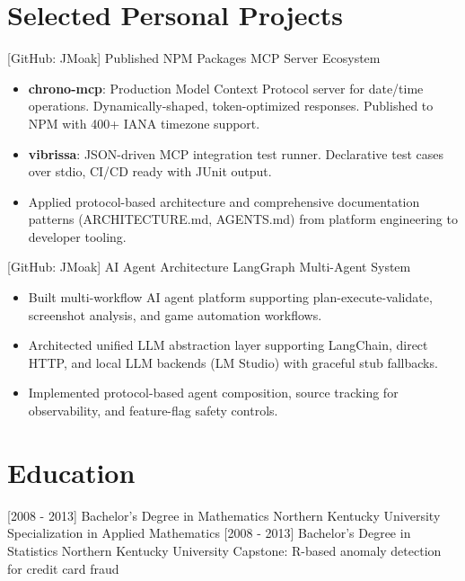 \documentclass[]{moak-resume}
\begin{document}
\section{Selected Personal Projects}
\begin{entrylist}
  \entry
    {[GitHub: JMoak]}
    {Published NPM Packages}
    {MCP Server Ecosystem}
    {}
\end{entrylist}
\begin{itemize}
  \item \small\bodyfont \textbf{chrono-mcp}: Production Model Context Protocol server for date/time operations. Dynamically-shaped, token-optimized responses. Published to NPM with 400+ IANA timezone support.
  \item \small\bodyfont \textbf{vibrissa}: JSON-driven MCP integration test runner. Declarative test cases over stdio, CI/CD ready with JUnit output.
  \item \small\bodyfont Applied protocol-based architecture and comprehensive documentation patterns (ARCHITECTURE.md, AGENTS.md) from platform engineering to developer tooling.
\end{itemize}

\begin{entrylist}
  \entry
    {[GitHub: JMoak]}
    {AI Agent Architecture}
    {LangGraph Multi-Agent System}
    {}
\end{entrylist}
\begin{itemize}
  \item \small\bodyfont Built multi-workflow AI agent platform supporting plan-execute-validate, screenshot analysis, and game automation workflows.
  \item \small\bodyfont Architected unified LLM abstraction layer supporting LangChain, direct HTTP, and local LLM backends (LM Studio) with graceful stub fallbacks.
  \item \small\bodyfont Implemented protocol-based agent composition, source tracking for observability, and feature-flag safety controls.
\end{itemize}

\section{Education}
\begin{entrylist}
  \entry
    {[2008 - 2013]}
    {Bachelor's Degree in Mathematics}
    {Northern Kentucky University}
    {Specialization in Applied Mathematics}
  \entry
    {[2008 - 2013]}
    {Bachelor's Degree in Statistics}
    {Northern Kentucky University}
    {Capstone: R-based anomaly detection for credit card fraud}
\end{entrylist}
\end{document}
